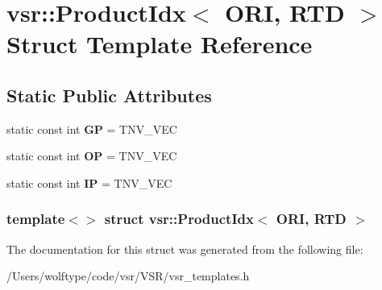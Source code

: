 \hypertarget{structvsr_1_1_product_idx_3_01_o_r_i_00_01_r_t_d_01_4}{\section{vsr\-:\-:Product\-Idx$<$ O\-R\-I, R\-T\-D $>$ Struct Template Reference}
\label{structvsr_1_1_product_idx_3_01_o_r_i_00_01_r_t_d_01_4}
}
\subsection*{Static Public Attributes}
\begin{DoxyCompactItemize}
\item 
\hypertarget{structvsr_1_1_product_idx_3_01_o_r_i_00_01_r_t_d_01_4_a92afa992e7597b1101003bb2aae9fd8d}{static const int {\bfseries G\-P} = T\-N\-V\-\_\-\-V\-E\-C}\label{structvsr_1_1_product_idx_3_01_o_r_i_00_01_r_t_d_01_4_a92afa992e7597b1101003bb2aae9fd8d}

\item 
\hypertarget{structvsr_1_1_product_idx_3_01_o_r_i_00_01_r_t_d_01_4_a91bc50788fdbdcce67a872a8c4f16300}{static const int {\bfseries O\-P} = T\-N\-V\-\_\-\-V\-E\-C}\label{structvsr_1_1_product_idx_3_01_o_r_i_00_01_r_t_d_01_4_a91bc50788fdbdcce67a872a8c4f16300}

\item 
\hypertarget{structvsr_1_1_product_idx_3_01_o_r_i_00_01_r_t_d_01_4_a690a1c9277b4972dd87b6720e835a100}{static const int {\bfseries I\-P} = T\-N\-V\-\_\-\-V\-E\-C}\label{structvsr_1_1_product_idx_3_01_o_r_i_00_01_r_t_d_01_4_a690a1c9277b4972dd87b6720e835a100}

\end{DoxyCompactItemize}
\subsubsection*{template$<$$>$ struct vsr\-::\-Product\-Idx$<$ O\-R\-I, R\-T\-D $>$}



The documentation for this struct was generated from the following file\-:\begin{DoxyCompactItemize}
\item 
/\-Users/wolftype/code/vsr/\-V\-S\-R/vsr\-\_\-templates.\-h\end{DoxyCompactItemize}
